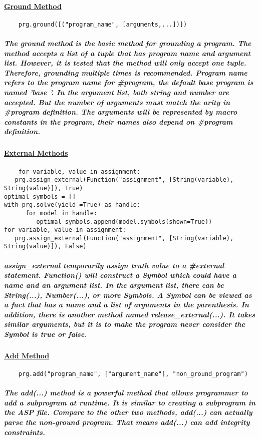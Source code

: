 \documentclass{article}
\begin{document}
	\paragraph{\underline{Ground Method}}
	\begin{verbatim}
	prg.ground([("program_name", [arguments,...])])
	\end{verbatim}
	\subparagraph{The ground method is the basic method for grounding a program. The method accepts a list of a tuple that has program name and argument list. However, it is tested that the method will only accept one tuple. Therefore, grounding multiple times is recommended. Program name refers to the program name for \#program, the default base program is named 'base '. In the argument list, both string and number are accepted. But the number of arguments must match the arity in \#program definition. The arguments will be represented by macro constants in the program, their names also depend on \#program definition.}
	\paragraph{\underline{External Methods}}
	\begin{verbatim}
	for variable, value in assignment:
   prg.assign_external(Function("assignment", [String(variable), String(value)]), True)
optimal_symbols = []
with prg.solve(yield_=True) as handle:
      for model in handle:
         optimal_symbols.append(model.symbols(shown=True))
for variable, value in assignment:
   prg.assign_external(Function("assignment", [String(variable), String(value)]), False)
	\end{verbatim}
	\subparagraph{assign\_external temporarily assign truth value to a \#external statement. Function() will construct a Symbol which could have a name and an argument list. In the argument list, there can be String(...), Number(...), or more Symbols. A Symbol can be viewed as a fact that has a name and a list of arguments in the parenthesis. In addition, there is another method named release\_external(...). It takes similar arguments, but it is to make the program never consider the Symbol is true or false.}
	\paragraph{\underline{Add Method}}
	\begin{verbatim}
	prg.add("program_name", ["argument_name"], "non_ground_program")
	\end{verbatim}
	\subparagraph{The add(...) method is a powerful method that allows programmer to add a subprogram at runtime. It is similar to creating a subprogram in the ASP file. Compare to the other two methods, add(...) can actually parse the non-ground program. That means add(...) can add integrity constraints.}
\end{document}
